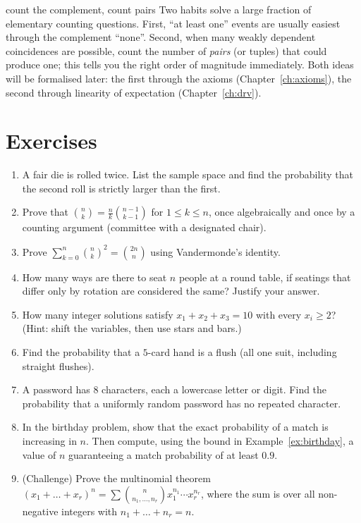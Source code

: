 \begin{interview}{count the complement, count pairs}
Two habits solve a large fraction of elementary counting questions. First,
``at least one'' events are usually easiest through the complement
``none''. Second, when many weakly dependent coincidences are possible, count
the number of \emph{pairs} (or tuples) that could produce one; this tells you
the right order of magnitude immediately. Both ideas will be formalised later:
the first through the axioms (Chapter~\ref{ch:axioms}), the second through
linearity of expectation (Chapter~\ref{ch:drv}).
\end{interview}

\section*{Exercises}

\begin{enumerate}
\item A fair die is rolled twice. List the sample space and find the
probability that the second roll is strictly larger than the first.
\item Prove that $\binom nk=\frac nk\binom{n-1}{k-1}$ for $1\le k\le n$, once
algebraically and once by a counting argument (committee with a designated
chair).
\item Prove $\sum_{k=0}^n\binom nk^2=\binom{2n}{n}$ using Vandermonde's
identity.
\item How many ways are there to seat $n$ people at a round table, if seatings
that differ only by rotation are considered the same? Justify your answer.
\item How many integer solutions satisfy $x_1+x_2+x_3=10$ with every
$x_i\ge 2$? (Hint: shift the variables, then use stars and bars.)
\item Find the probability that a $5$-card hand is a flush (all one suit,
including straight flushes).
\item A password has $8$ characters, each a lowercase letter or digit. Find the
probability that a uniformly random password has no repeated character.
\item In the birthday problem, show that the exact probability of a match is
increasing in $n$. Then compute, using the bound in
Example~\ref{ex:birthday}, a value of $n$ guaranteeing a match probability of
at least $0.9$.
\item (Challenge) Prove the multinomial theorem
$(x_1+\dots+x_r)^n=\sum\binom{n}{n_1,\dots,n_r}x_1^{n_1}\cdots x_r^{n_r}$,
where the sum is over all non-negative integers with $n_1+\dots+n_r=n$.
\end{enumerate}
